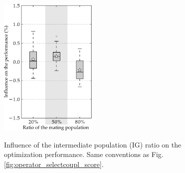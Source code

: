 \documentclass{ametsoc}
\begin{document}
\begin{figure}[t]
	\begin{center}
		\noindent\includegraphics[width=11pc,angle=0]{fig14.pdf}\\
	\end{center}
	\caption{Influence of the intermediate population (IG) ratio on the optimization performance. Same conventions as Fig. \ref{fig:operator_selectcoupl_score}.}
	\label{fig:option_popratio_score}
\end{figure}
\end{document}
